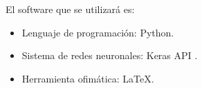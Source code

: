 El software que se utilizará es:
\begin{itemize}
	\item Lenguaje de programación: Python.
	\item Sistema de redes neuronales: Keras API \cite{Keras2015}.
	\item Herramienta ofimática: \LaTeX.
\end{itemize}
